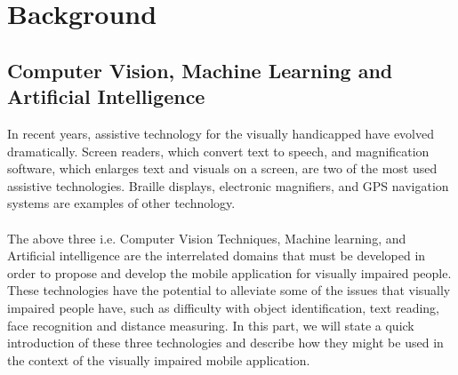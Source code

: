 \documentclass[MScCS]{uccthesis}
\begin{document}
\section{Background}
\subsection {Computer Vision, Machine Learning and\\ Artificial Intelligence}
In recent years, assistive technology for the visually handicapped have evolved dramatically. Screen readers, which convert text to speech, and magnification software, which enlarges text and visuals on a screen, are two of the most used assistive technologies. Braille displays, electronic magnifiers, and GPS navigation systems are examples of other technology.\\
\\The above three i.e. Computer Vision Techniques, Machine learning, and Artificial intelligence are the interrelated domains that must be developed in order to propose and develop the  mobile application for visually impaired people. These technologies have the potential to alleviate some of the issues that visually impaired people have, such as difficulty with object identification, text reading, face recognition and distance measuring. In this part, we will state a quick introduction of these three technologies and describe how they might be used in the context of the visually impaired mobile application.
\\
\end{document}
